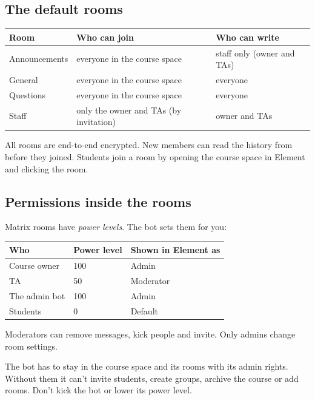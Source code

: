 \subsection*{The default rooms}

\begin{center}
\begin{tabularx}{\textwidth}{@{}lLL@{}}
\toprule
\textbf{Room} & \textbf{Who can join} & \textbf{Who can write} \\
\midrule
Announcements & everyone in the course space & staff only (owner and TAs) \\
General & everyone in the course space & everyone \\
Questions & everyone in the course space & everyone \\
Staff & only the owner and TAs (by invitation) & owner and TAs \\
\bottomrule
\end{tabularx}
\end{center}

All rooms are end-to-end encrypted. New members can read the history from before they
joined. Students join a room by opening the course space in Element and clicking the room.

\subsection*{Permissions inside the rooms}

Matrix rooms have \emph{power levels}. The bot sets them for you:

\begin{center}
\begin{tabular}{@{}lll@{}}
\toprule
\textbf{Who} & \textbf{Power level} & \textbf{Shown in Element as} \\
\midrule
Course owner & 100 & Admin \\
TA & 50 & Moderator \\
The admin bot & 100 & Admin \\
Students & 0 & Default \\
\bottomrule
\end{tabular}
\end{center}

Moderators can remove messages, kick people and invite. Only admins change room settings.

\begin{warning}
The bot has to stay in the course space and its rooms with its admin rights. Without them it
can't invite students, create groups, archive the course or add rooms. Don't kick the bot or
lower its power level.
\end{warning}

